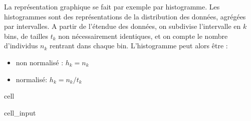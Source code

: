 \documentclass[letterpaper,10pt,english]{jupyterBook}
\begin{document}
\sphinxAtStartPar
La représentation graphique se fait par exemple par histogramme.
Les histogrammes sont des représentations de la distribution des données, agrégées par intervalles. A partir de l’étendue des données, on subdivise l’intervalle en \(k\) bins, de tailles \(t_k\) non nécessairement identiques, et on compte le nombre d’individus \(n_k\) rentrant dans chaque bin. L’histogramme peut alors être :
\begin{itemize}
\item {} 
\sphinxAtStartPar
non normalisé : \(h_k = n_k\)

\item {} 
\sphinxAtStartPar
normalisé: \(h_k = n_k/t_k\)

\end{itemize}

\begin{sphinxuseclass}{cell}\begin{sphinxVerbatimInput}

\begin{sphinxuseclass}{cell_input}
\begin{sphinxVerbatim}[commandchars=\\\{\}]
   
   
   \PYG{p}{[}\PYG{p}{]}

  
      
            
               
                   
                 
         
    
      \PYG{p}{[}\PYG{p}{]}  
       
           
           
            \PYG{p}{[}\PYG{p}{]}  


\end{sphinxVerbatim}
\end{sphinxuseclass}
\end{sphinxVerbatimInput}
\end{sphinxuseclass}
\end{document}
